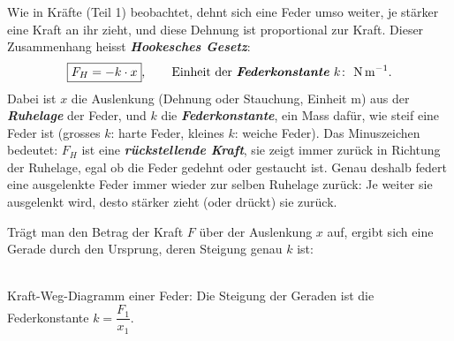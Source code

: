\documentclass[addpoints,11pt,a4paper]{exam}
\newlength{\antwortraumlen}
\newcommand{\Antwortraum}[1]{%
  \pgfmathsetlength{\antwortraumlen}{#1*2.5cm}%
  \begin{answerbox}
    \rule{0pt}{\antwortraumlen}%
  \end{answerbox}%
}
\begin{document}
\begin{questions}
\begin{taskbox}
\end{taskbox}
\end{questions}

\begin{theoriebox}
Wie in Kräfte (Teil 1) beobachtet, dehnt sich eine Feder umso weiter, je
stärker eine Kraft an ihr zieht, und diese Dehnung ist proportional zur
Kraft. Dieser Zusammenhang heisst \textbf{\emph{Hookesches Gesetz}}:
\[
  \boxed{F_H = -k\cdot x}, \qquad \text{Einheit der \textbf{\emph{Federkonstante}} } k\colon\ \si{\newton\per\meter}.
\]
Dabei ist $x$ die Auslenkung (Dehnung oder Stauchung, Einheit
$\si{\meter}$) aus der \textbf{\emph{Ruhelage}} der Feder, und $k$ die
\textbf{\emph{Federkonstante}}, ein Mass dafür, wie \glqq steif\grqq{}
eine Feder ist (grosses $k$: harte Feder, kleines $k$: weiche Feder). Das
Minuszeichen bedeutet: $F_H$ ist eine \textbf{\emph{rückstellende
Kraft}}, sie zeigt immer zurück in Richtung der Ruhelage, egal ob die
Feder gedehnt oder gestaucht ist. Genau deshalb federt eine ausgelenkte
Feder immer wieder zur selben Ruhelage zurück: Je weiter sie ausgelenkt
wird, desto stärker zieht (oder drückt) sie zurück.

Trägt man den Betrag der Kraft $F$ über der Auslenkung $x$ auf, ergibt
sich eine Gerade durch den Ursprung, deren Steigung genau $k$ ist:

\begin{center}
\\[0.2em]
{\scriptsize Kraft-Weg-Diagramm einer Feder: Die Steigung der Geraden ist
die Federkonstante $k=\dfrac{F_1}{x_1}$.}
\end{center}
\end{theoriebox}
\end{document}
